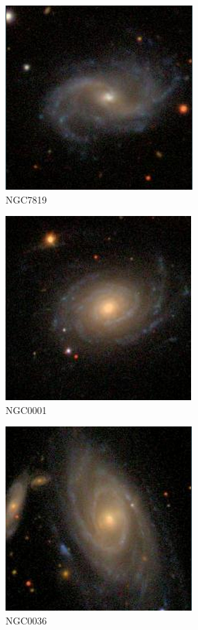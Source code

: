 \documentclass[9pt]{revtex4-1}
\begin{document}
\begin{@twocolumnfalse}
\begin{center}
\begin{tabular}{ l c c }
 \end{tabular}
 \end{center}
 
\end{@twocolumnfalse}
 

\twocolumngrid

\begin{figure}
\includegraphics[scale=0.3]{NGC7819.png}
\caption{NGC7819}
\end{figure}
\begin{figure}
\includegraphics[scale=0.3]{NGC0001.png}
\caption{NGC0001}
\end{figure}
\begin{figure}
\includegraphics[scale=0.3]{NGC0036.png}
\caption{NGC0036}
\end{figure}
\end{document}

